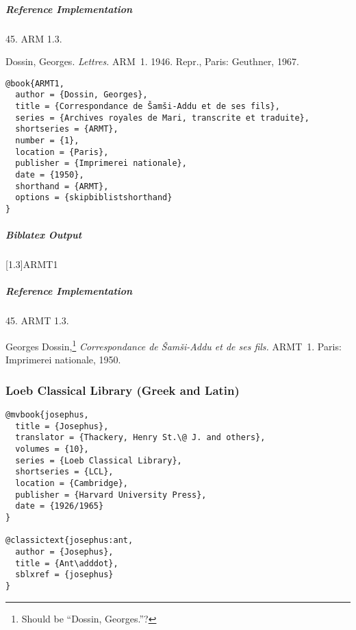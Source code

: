 \documentclass[a4paper]{article}
\newenvironment{biboutput}{%
  \subparagraph{Biblatex Output}
}{\color{black}}
\newenvironment{refimp}{%
  \subparagraph{Reference Implementation}
  \color{reference-colour}
  \rm
}{\par\color{black}}
\begin{document}
\begin{refimp}
  \hspace*{\bibindent}45. ARM 1.3.

  \hangindent\bibindent Dossin, Georges. \emph{Lettres.} ARM~1. 1946. Repr.,
  Paris: Geuthner, 1967.

\end{refimp}

\medskip

\begin{lstlisting}
@book{ARMT1,
  author = {Dossin, Georges},
  title = {Correspondance de Šamši-Addu et de ses fils},
  series = {Archives royales de Mari, transcrite et traduite},
  shortseries = {ARMT},
  number = {1},
  location = {Paris},
  publisher = {Imprimerei nationale},
  date = {1950},
  shorthand = {ARMT},
  options = {skipbiblistshorthand}
}
\end{lstlisting}

\begin{biboutput}
  [1.3]{ARMT1}
\end{biboutput}

\begin{refimp}
  \hspace*{\bibindent}45. ARMT 1.3.

  \hangindent\bibindent Georges Dossin,\footnote{Should be “Dossin,
  Georges.”?} \emph{Correspondance de Šamši-Addu et de ses fils.} ARMT~1.
  Paris: Imprimerei nationale, 1950.

\end{refimp}

\subsubsection{Loeb Classical Library (Greek and Latin)}

\begin{lstlisting}
@mvbook{josephus,
  title = {Josephus},
  translator = {Thackery, Henry St.\@ J. and others},
  volumes = {10},
  series = {Loeb Classical Library},
  shortseries = {LCL},
  location = {Cambridge},
  publisher = {Harvard University Press},
  date = {1926/1965}
}

@classictext{josephus:ant,
  author = {Josephus},
  title = {Ant\adddot},
  sblxref = {josephus}
}
\end{lstlisting}
\end{document}
